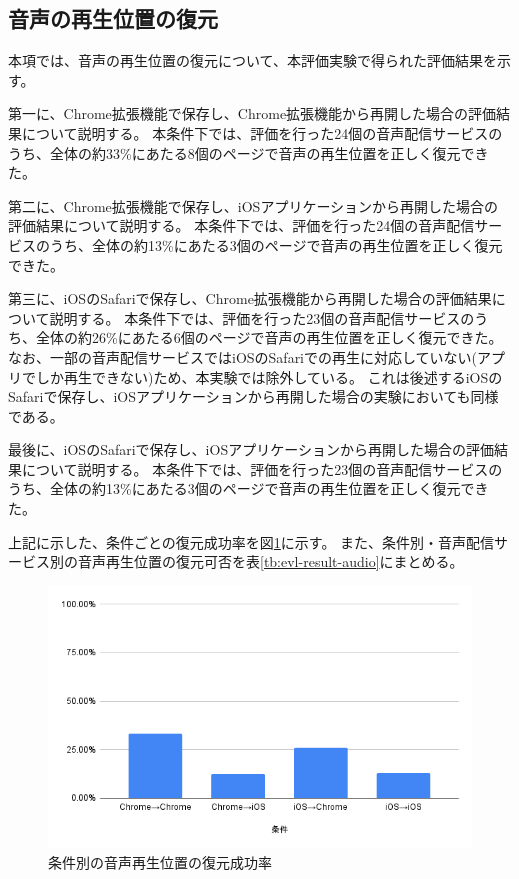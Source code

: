 
\subsection{音声の再生位置の復元}
本項では、音声の再生位置の復元について、本評価実験で得られた評価結果を示す。

第一に、Chrome拡張機能で保存し、Chrome拡張機能から再開した場合の評価結果について説明する。
本条件下では、評価を行った24個の音声配信サービスのうち、全体の約33\%にあたる8個のページで音声の再生位置を正しく復元できた。

第二に、Chrome拡張機能で保存し、iOSアプリケーションから再開した場合の評価結果について説明する。
本条件下では、評価を行った24個の音声配信サービスのうち、全体の約13\%にあたる3個のページで音声の再生位置を正しく復元できた。

第三に、iOSのSafariで保存し、Chrome拡張機能から再開した場合の評価結果について説明する。
本条件下では、評価を行った23個の音声配信サービスのうち、全体の約26\%にあたる6個のページで音声の再生位置を正しく復元できた。
なお、一部の音声配信サービスではiOSのSafariでの再生に対応していない(アプリでしか再生できない)ため、本実験では除外している。
これは後述するiOSのSafariで保存し、iOSアプリケーションから再開した場合の実験においても同様である。

最後に、iOSのSafariで保存し、iOSアプリケーションから再開した場合の評価結果について説明する。
本条件下では、評価を行った23個の音声配信サービスのうち、全体の約13\%にあたる3個のページで音声の再生位置を正しく復元できた。

上記に示した、条件ごとの復元成功率を図\ref{fig:success-rate-audio}に示す。
また、条件別・音声配信サービス別の音声再生位置の復元可否を表\ref{tb:evl-result-audio}にまとめる。

\begin{figure}[htbp]
  \caption{条件別の音声再生位置の復元成功率}
  \label{fig:success-rate-audio}
  \begin{center}
    \includegraphics[bb=0 0 600 371,width=15cm]{img/060_evaluation/result/audio/success-rate-audio.pdf}
  \end{center}
\end{figure}

